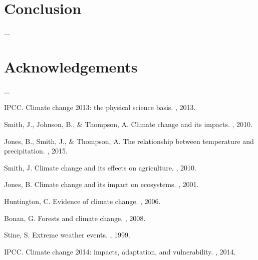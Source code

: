 \documentclass{article}
\begin{document}
\section{Conclusion}
...

\section{Acknowledgements}
...




\begin{thebibliography}{10}

IPCC.
\newblock Climate change 2013: the physical science basis.
, 2013.

Smith, J., Johnson, B., \& Thompson, A.
\newblock Climate change and its impacts.
, 2010.

Jones, B., Smith, J., \& Thompson, A.
\newblock The relationship between temperature and precipitation.
, 2015.

Smith, J.
\newblock Climate change and its effects on agriculture.
, 2010.

Jones, B.
\newblock Climate change and its impact on ecosystems.
, 2001.

Huntington, C.
\newblock Evidence of climate change.
, 2006.

Bonan, G.
\newblock Forests and climate change.
, 2008.

Stine, S.
\newblock Extreme weather events.
, 1999.

IPCC.
\newblock Climate change 2014: impacts, adaptation, and vulnerability.
, 2014.


\end{thebibliography}
\end{document}
